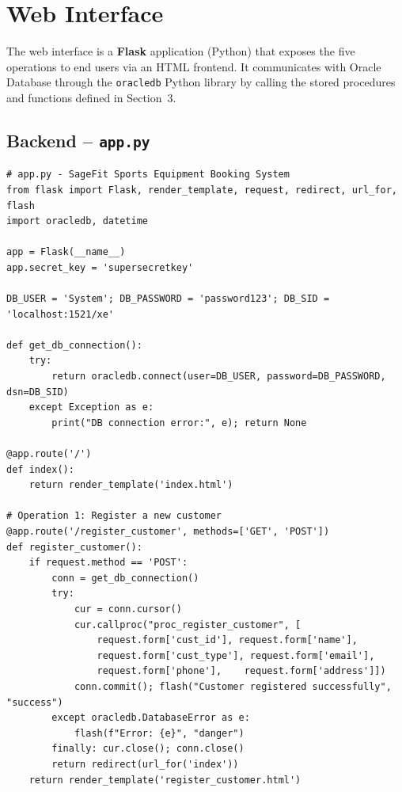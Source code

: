\section{Web Interface}

The web interface is a \textbf{Flask} application (Python) that exposes the five operations to end users
via an HTML frontend. It communicates with Oracle Database through the \texttt{oracledb} Python library
by calling the stored procedures and functions defined in Section~3.

\subsection{Backend -- \texttt{app.py}}

\begin{lstlisting}
# app.py - SageFit Sports Equipment Booking System
from flask import Flask, render_template, request, redirect, url_for, flash
import oracledb, datetime

app = Flask(__name__)
app.secret_key = 'supersecretkey'

DB_USER = 'System'; DB_PASSWORD = 'password123'; DB_SID = 'localhost:1521/xe'

def get_db_connection():
    try:
        return oracledb.connect(user=DB_USER, password=DB_PASSWORD, dsn=DB_SID)
    except Exception as e:
        print("DB connection error:", e); return None

@app.route('/')
def index():
    return render_template('index.html')

# Operation 1: Register a new customer
@app.route('/register_customer', methods=['GET', 'POST'])
def register_customer():
    if request.method == 'POST':
        conn = get_db_connection()
        try:
            cur = conn.cursor()
            cur.callproc("proc_register_customer", [
                request.form['cust_id'], request.form['name'],
                request.form['cust_type'], request.form['email'],
                request.form['phone'],    request.form['address']])
            conn.commit(); flash("Customer registered successfully", "success")
        except oracledb.DatabaseError as e:
            flash(f"Error: {e}", "danger")
        finally: cur.close(); conn.close()
        return redirect(url_for('index'))
    return render_template('register_customer.html')


\end{lstlisting}
